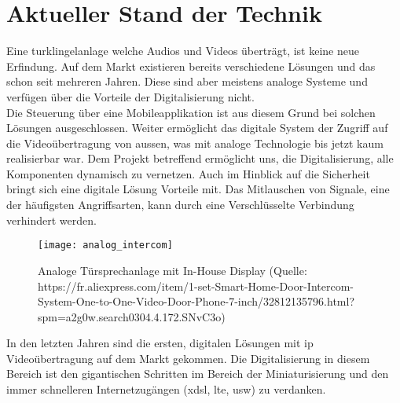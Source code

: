 \section{Aktueller Stand der Technik}
\label{sec:chapterexample}
Eine \gls{turklingelanlage} welche Audios und Videos überträgt, ist keine neue Erfindung. Auf dem Markt existieren bereits verschiedene Lösungen und das schon seit mehreren Jahren. Diese sind aber meistens analoge Systeme und verfügen über die Vorteile der Digitalisierung nicht. 
\\
Die Steuerung über eine Mobileapplikation ist aus diesem Grund bei solchen Lösungen ausgeschlossen.
Weiter ermöglicht das digitale System der Zugriff auf die Videoübertragung von aussen, was mit analoge Technologie bis jetzt kaum realisierbar war.
Dem Projekt betreffend ermöglicht uns, die Digitalisierung, alle Komponenten dynamisch zu vernetzen. Auch im Hinblick auf die Sicherheit bringt sich eine digitale Lösung Vorteile mit. Das Mitlauschen von Signale, eine der häufigsten Angriffsarten, kann durch eine Verschlüsselte Verbindung verhindert werden.  

\begin{figure}[htb!]
	\begin{center}
		\texttt{[image: analog\_intercom]}
		\caption[Analoge Türsprechanlage mit In-House Display]{Analoge Türsprechanlage mit In-House Display (Quelle: https://fr.aliexpress.com/item/1-set-Smart-Home-Door-Intercom-System-One-to-One-Video-Door-Phone-7-inch/32812135796.html?spm=a2g0w.search0304.4.172.SNvC3o)}
		\label{fig:analoge_intercom}
	\end{center}
\end{figure}
In den letzten Jahren sind die ersten, digitalen Lösungen mit \gls{ip} Videoübertragung auf dem Markt gekommen. Die Digitalisierung in diesem Bereich ist den gigantischen Schritten im Bereich der Miniaturisierung und den immer schnelleren Internetzugängen (x\gls{dsl}, \gls{lte}, usw) zu verdanken.
\\


